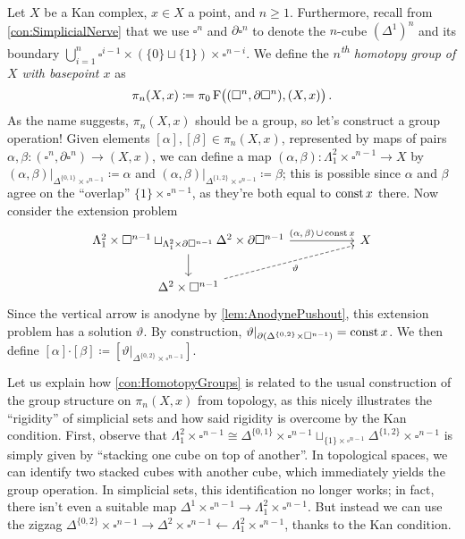 \begin{con}\label{con:HomotopyGroups}
	Let $X$ be a Kan complex, $x\in X$ a point, and $n\geqslant 1$. Furthermore, recall from \cref{con:SimplicialNerve} that we use $\square^n$ and $\partial\square^n$ to denote the $n$-cube $(\Delta^1)^n$ and its boundary $\bigcup_{i=1}^n\square^{i-1}\times(\{0\}\sqcup\{1\})\times\square^{n-i}$. We define the \emph{$n$\textsuperscript{th} homotopy group of $X$ with basepoint $x$} as
	\begin{equation*}
		\pi_n(X,x)\coloneqq\pi_0\operatorname{F}\bigl((\square^n,\partial\square^n),(X,x)\bigr)\,.
	\end{equation*}
	As the name suggests, $\pi_n(X,x)$ should be a group, so let's construct a group operation! Given elements $[\alpha],[\beta]\in\pi_n(X,x)$, represented by maps of pairs $\alpha,\beta\colon (\square^n,\partial\square^n)\rightarrow (X,x)$, we can define a map $(\alpha,\beta)\colon \Lambda_1^2\times\square^{n-1}\rightarrow X$ by $(\alpha,\beta)|_{\Delta^{\{0,1\}}\times\square^{n-1}}\coloneqq \alpha$ and $(\alpha,\beta)|_{\Delta^{\{1,2\}}\times\square^{n-1}}\coloneqq \beta$; this is possible since $\alpha$ and $\beta$ agree on the \enquote{overlap} $\{1\}\times\square^{n-1}$, as they're both equal to $\operatorname{const} x$ there. Now consider the extension problem
	\begin{equation*}
		\begin{tikzcd}[column sep=5.2em]
			\Lambda_1^2\times\square^{n-1}\sqcup_{\Lambda_1^2\times\partial\square^{n-1}}\Delta^2\times\partial\square^{n-1}\dar\rar["{(\alpha,\,\beta)\,\cup\, \const x}"] & X\\
			\Delta^2\times\square^{n-1}\urar[dashed,"\vartheta"',end anchor=202]
		\end{tikzcd}
	\end{equation*}
	Since the vertical arrow is anodyne by \cref{lem:AnodynePushout}, this extension problem has a solution $\vartheta$. By construction, $\vartheta|_{\partial(\Delta^{\{0,2\}}\times\square^{n-1})}=\operatorname{const} x$. We then define $[\alpha]\mathbin{\boldsymbol{\cdot}}[\beta]\coloneqq [\vartheta|_{\Delta^{\{0,2\}}\times\square^{n-1}}]$.
\end{con}
\begin{rem}\label{rem:HomotopyGroupsTopology}
	Let us explain how \cref{con:HomotopyGroups} is related to the usual construction of the group structure on $\pi_n(X,x)$ from topology, as this nicely illustrates the \enquote{rigidity} of simplicial sets and how said rigidity is overcome by the Kan condition. First, observe that $\Lambda_1^2\times\square^{n-1}\cong \Delta^{\{0,1\}}\times\square^{n-1}\sqcup_{\{1\}\times \square^{n-1}}\Delta^{\{1,2\}}\times\square^{n-1}$ is simply given by \enquote{stacking one cube on top of another}. In topological spaces, we can identify two stacked cubes with another cube, which immediately yields the group operation. In simplicial sets, this identification no longer works; in fact, there isn't even a suitable map $\Delta^1\times\square^{n-1}\rightarrow \Lambda_1^2\times \square^{n-1}$. But instead we can use the zigzag $\Delta^{\{0,2\}}\times\square^{n-1}\rightarrow \Delta^2\times\square^{n-1}\leftarrow \Lambda_1^2\times\square^{n-1}$, thanks to the Kan condition.
\end{rem}
